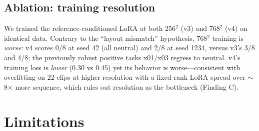 \documentclass[conference]{IEEEtran}
\begin{document}
\subsection{Ablation: training resolution}
We trained the reference-conditioned LoRA at both 256$^2$ (v3) and 768$^2$ (v4) on identical data.
Contrary to the ``layout mismatch'' hypothesis, 768$^2$ training is \emph{worse}: v4 scores 0/8 at
seed 42 (all neutral) and 2/8 at seed 1234, versus v3's 3/8 and 4/8; the previously robust positive
tasks x01/x03 regress to neutral. v4's training loss is \emph{lower} (0.30 vs 0.45) yet its
behavior is worse---consistent with overfitting on 22 clips at higher resolution with a fixed-rank LoRA
spread over $\sim$8$\times$ more sequence, which rules out resolution as the bottleneck (Finding C).

\section{Limitations}
\end{document}
